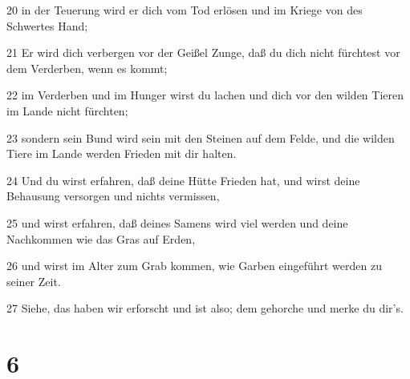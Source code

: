 \par 20 in der Teuerung wird er dich vom Tod erlösen und im Kriege von des Schwertes Hand;
\par 21 Er wird dich verbergen vor der Geißel Zunge, daß du dich nicht fürchtest vor dem Verderben, wenn es kommt;
\par 22 im Verderben und im Hunger wirst du lachen und dich vor den wilden Tieren im Lande nicht fürchten;
\par 23 sondern sein Bund wird sein mit den Steinen auf dem Felde, und die wilden Tiere im Lande werden Frieden mit dir halten.
\par 24 Und du wirst erfahren, daß deine Hütte Frieden hat, und wirst deine Behausung versorgen und nichts vermissen,
\par 25 und wirst erfahren, daß deines Samens wird viel werden und deine Nachkommen wie das Gras auf Erden,
\par 26 und wirst im Alter zum Grab kommen, wie Garben eingeführt werden zu seiner Zeit.
\par 27 Siehe, das haben wir erforscht und ist also; dem gehorche und merke du dir's.

\chapter{6}

